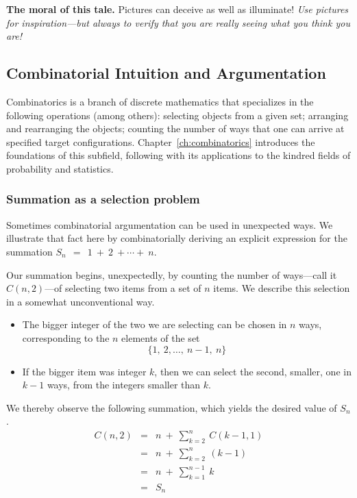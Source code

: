\bigskip

\noindent
{\bf The moral of this tale.}  Pictures can deceive as well as illuminate!  {\em Use pictures for inspiration---but always to verify that you are really seeing what you think you are!}




\subsection{Combinatorial Intuition and Argumentation}
\label{sec:comb-proofs}

Combinatorics is a branch of discrete mathematics that specializes in the following operations (among others): selecting objects from a given set; arranging and rearranging the objects; counting the number of ways that one can arrive at specified target configurations.
Chapter~\ref{ch:combinatorics} introduces the foundations of this subfield, following with its applications to the kindred fields of probability and statistics.

\subsubsection{Summation as a selection problem}
\label{sec:comb-sum-of-first-n}

Sometimes combinatorial argumentation can be used in unexpected ways.  We illustrate that fact here by   combinatorially deriving an explicit expression for the summation
$S_n \ \ = \ \ 1 \ + \ 2 \ + \cdots + \ n$.

Our summation begins, unexpectedly, by counting the number of ways---call it $C(n,2)$---of selecting two items from a set of $n$ items.  We describe this selection in a somewhat unconventional way.
\begin{itemize}
\item
The bigger integer of the two we are selecting can be chosen in $n$ ways, corresponding to the $n$ elements of the set
\[ \{ 1, \ 2, \ldots, \ n-1, \ n \} \]
\medskip\item
If the bigger item was integer $k$, then we can select the second, smaller, one in $k-1$ ways, from the integers smaller than $k$.
\end{itemize}
We thereby observe the following summation, which yields the desired value of $S_n$.
\begin{eqnarray*}
C(n,2) & = & n \ + \ \sum_{k=2}^n \ C(k-1,1) \\
       & = & n \ + \ \sum_{k=2}^n \ (k-1) \\
       & = & n \ + \ \sum_{k=1}^{n-1} \ k \\
       & = & S_n
\end{eqnarray*}

